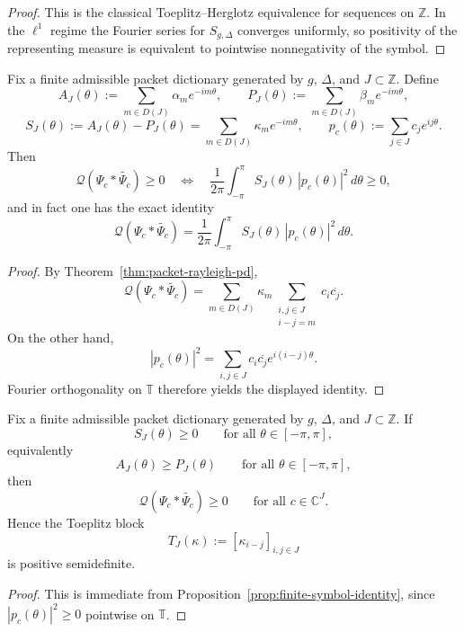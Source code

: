 \begin{proof}
This is the classical Toeplitz--Herglotz equivalence for sequences on
$\mathbb Z$. In the $\ell^1$ regime the Fourier series for $S_{g,\Delta}$
converges uniformly, so positivity of the representing measure is equivalent to
pointwise nonnegativity of the symbol.
\end{proof}

\begin{proposition}\label{prop:finite-symbol-identity}
Fix a finite admissible packet dictionary generated by $g$, $\Delta$, and
$J\subset\mathbb Z$. Define
\[
  A_J(\theta):=\sum_{m\in D(J)} \alpha_m e^{-im\theta},
  \qquad
  P_J(\theta):=\sum_{m\in D(J)} \beta_m e^{-im\theta},
\]
\[
  S_J(\theta):=A_J(\theta)-P_J(\theta)
  =
  \sum_{m\in D(J)} \kappa_m e^{-im\theta},
  \qquad
  p_c(\theta):=\sum_{j\in J} c_j e^{ij\theta}.
\]
Then
\[
  \mathcal Q(\Psi_c*\widetilde{\Psi_c})\ge0
  \quad\Longleftrightarrow\quad
  \frac{1}{2\pi}\int_{-\pi}^{\pi} S_J(\theta)\,|p_c(\theta)|^2\,d\theta\ge0,
\]
and in fact one has the exact identity
\[
  \mathcal Q(\Psi_c*\widetilde{\Psi_c})
  =
  \frac{1}{2\pi}\int_{-\pi}^{\pi} S_J(\theta)\,|p_c(\theta)|^2\,d\theta.
\]
\end{proposition}

\begin{proof}
By Theorem~\ref{thm:packet-rayleigh-pd},
\[
  \mathcal Q(\Psi_c * \widetilde{\Psi_c})
  =
  \sum_{m\in D(J)} \kappa_m
  \sum_{\substack{i,j\in J\\ i-j=m}} c_i\overline{c_j}.
\]
On the other hand,
\[
  |p_c(\theta)|^2
  =
  \sum_{i,j\in J} c_i\overline{c_j}e^{i(i-j)\theta}.
\]
Fourier orthogonality on $\mathbb T$ therefore yields the displayed identity.
\end{proof}

\begin{corollary}\label{cor:finite-symbol-domination}
Fix a finite admissible packet dictionary generated by $g$, $\Delta$, and
$J\subset\mathbb Z$. If
\[
  S_J(\theta)\ge0
  \qquad\text{for all }\theta\in[-\pi,\pi],
\]
equivalently
\[
  A_J(\theta)\ge P_J(\theta)
  \qquad\text{for all }\theta\in[-\pi,\pi],
\]
then
\[
  \mathcal Q(\Psi_c*\widetilde{\Psi_c})\ge0
  \qquad\text{for all }c\in\mathbb C^J.
\]
Hence the Toeplitz block
\[
  T_J(\kappa):=[\kappa_{i-j}]_{i,j\in J}
\]
is positive semidefinite.
\end{corollary}

\begin{proof}
This is immediate from Proposition~\ref{prop:finite-symbol-identity}, since
$|p_c(\theta)|^2\ge0$ pointwise on $\mathbb T$.
\end{proof}

